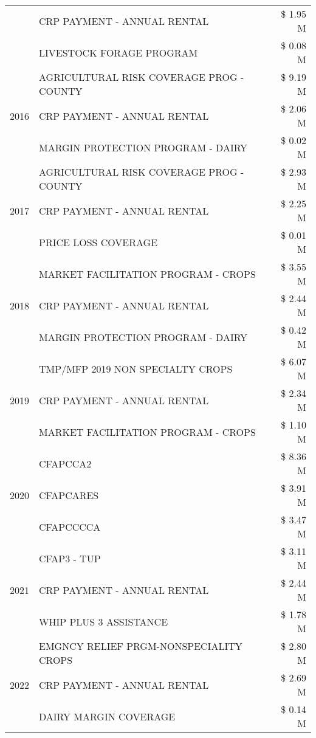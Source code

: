 \begin{tabular}{llr}
 & CRP PAYMENT - ANNUAL RENTAL & \$ 1.95 M \\
 & LIVESTOCK FORAGE PROGRAM & \$ 0.08 M \\
\cline{1-3}
\multirow[t]{3}{*}{2016} & AGRICULTURAL RISK COVERAGE PROG - COUNTY & \$ 9.19 M \\
 & CRP PAYMENT - ANNUAL RENTAL & \$ 2.06 M \\
 & MARGIN PROTECTION PROGRAM - DAIRY & \$ 0.02 M \\
\cline{1-3}
\multirow[t]{3}{*}{2017} & AGRICULTURAL RISK COVERAGE PROG - COUNTY & \$ 2.93 M \\
 & CRP PAYMENT - ANNUAL RENTAL & \$ 2.25 M \\
 & PRICE LOSS COVERAGE & \$ 0.01 M \\
\cline{1-3}
\multirow[t]{3}{*}{2018} & MARKET FACILITATION PROGRAM - CROPS & \$ 3.55 M \\
 & CRP PAYMENT - ANNUAL RENTAL & \$ 2.44 M \\
 & MARGIN PROTECTION PROGRAM - DAIRY & \$ 0.42 M \\
\cline{1-3}
\multirow[t]{3}{*}{2019} & TMP/MFP 2019 NON SPECIALTY CROPS & \$ 6.07 M \\
 & CRP PAYMENT - ANNUAL RENTAL & \$ 2.34 M \\
 & MARKET FACILITATION PROGRAM - CROPS & \$ 1.10 M \\
\cline{1-3}
\multirow[t]{3}{*}{2020} & CFAPCCA2 & \$ 8.36 M \\
 & CFAPCARES & \$ 3.91 M \\
 & CFAPCCCCA & \$ 3.47 M \\
\cline{1-3}
\multirow[t]{3}{*}{2021} & CFAP3 - TUP & \$ 3.11 M \\
 & CRP PAYMENT - ANNUAL RENTAL & \$ 2.44 M \\
 & WHIP PLUS 3 ASSISTANCE & \$ 1.78 M \\
\cline{1-3}
\multirow[t]{3}{*}{2022} & EMGNCY RELIEF PRGM-NONSPECIALITY CROPS & \$ 2.80 M \\
 & CRP PAYMENT - ANNUAL RENTAL & \$ 2.69 M \\
 & DAIRY MARGIN COVERAGE & \$ 0.14 M \\
\cline{1-3}
\bottomrule
\end{tabular}
